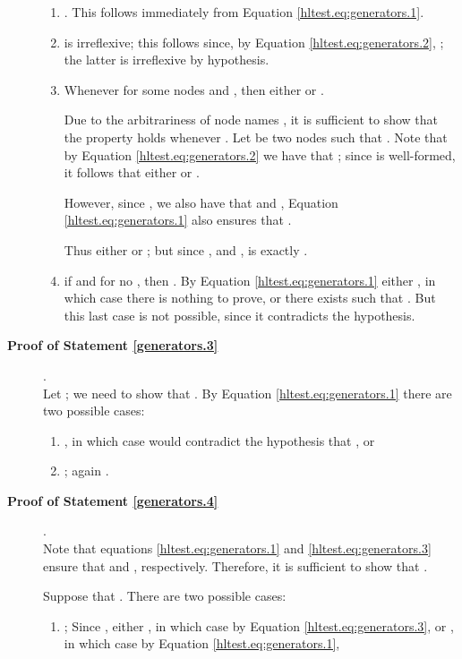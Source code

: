 \documentclass{LMCS}
\begin{document}
\begin{description}
\begin{enumerate}
\item . This follows immediately from  
Equation \eqref{hltest.eq:generators.1}.

\item  is irreflexive; this follows since, by Equation \eqref{hltest.eq:generators.2}, 
; the latter is irreflexive by hypothesis.

\item Whenever  for some nodes  and , 
then either  or . 

Due to the arbitrariness of node names , it is sufficient to show that 
the property holds whenever . 
Let  be two nodes such that . 
Note that by Equation \eqref{hltest.eq:generators.2} we have that ; since  is well-formed, it follows 
that either  or .

However, since , we also have that  and , 
Equation \eqref{hltest.eq:generators.1} also ensures that .

Thus either  or ; 
but since , and ,  
 is exactly .

\item if  and  for no , 
then . By Equation \ref{hltest.eq:generators.1} either , in 
which case there is nothing to prove, or there exists  such that . 
But this last case is not possible, since it contradicts the hypothesis.

\end{enumerate}

\item[\textbf{Proof of Statement \ref{generators.3}}] .\\
Let ; we need to show that . By Equation \ref{hltest.eq:generators.1} 
there are two possible cases:
\begin{enumerate}
\item , in which case  would contradict the hypothesis that 
, or 
\item ; 
again .
\end{enumerate}

\item[\textbf{Proof of Statement \ref{generators.4}}] .\\ 
Note that equations \eqref{hltest.eq:generators.1} and \eqref{hltest.eq:generators.3} ensure that 
 and , respectively. 
Therefore, it is sufficient to show that . 

Suppose that . There are two possible cases:
\begin{enumerate}
\item ; Since , either 
, in which case  by Equation \eqref{hltest.eq:generators.3}, 
or , in which case  by Equation \eqref{hltest.eq:generators.1},


\end{enumerate}
\end{description}
\end{document}
